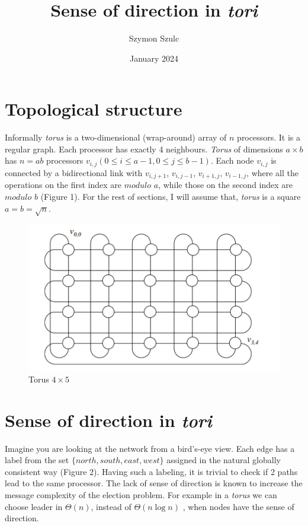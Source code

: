 \documentclass{article}
\title{Sense of direction in \textit{tori}}
\author{Szymon Szulc}
\date{January 2024}
\begin{document}
\maketitle

\section{Topological structure}
Informally \textit{torus} is a two-dimensional (wrap-around) array of $n$ processors. It is a regular graph. Each processor has exactly 4 neighbours.
\textit{Torus} of dimensions $a \times b $ has $n = ab$ processors $v_{i,j}(0 \leq i \leq a - 1, 0 \leq j \leq b - 1)$. Each node $v_{i,j}$ is connected by a bidirectional link with $v_{i,j+1}$, $v_{i,j-1}$, $v_{i+1,j}$, 
$v_{i-1,j}$, where all
the operations on the first index are $\textit{modulo } a$, while those on the second index are
$\textit{modulo } b$ (Figure 1). For the rest of sections, I will assume that, \textit{torus} is a square \mbox{$a=b=\sqrt{n}$}.

\begin{figure}[h!]
\centering
\includegraphics{torus.png}
\caption{Torus $4 \times 5$ \cite{mans}}
\label{fig:torus}
\end{figure}

\newpage

\section{Sense of direction in \textit{tori}}
Imagine you are looking at the network from a bird's-eye view. Each edge has a label from the set $\{north, south, east, west\}$ assigned in the
natural globally consistent way (Figure 2). Having such a labeling, it is trivial to check if 2 paths lead to the same processor. The lack of sense of direction is known to increase the message complexity of the election problem. For example in a \textit{torus} we can choose leader in $\Theta(n)$, instead of $\Theta(n\log{n})$ \cite{mans}, when nodes have the sense of direction.
\end{document}
